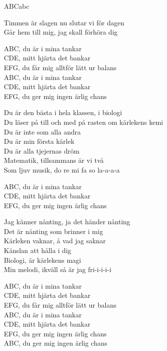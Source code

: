 \begin{song}{ABC}{abc}
\begin{vers}
Timmen är slagen nu slutar vi för dagen\\
Går hem till mig, jag skall förhöra dig\\
\end{vers}
\begin{vers}
ABC, du är i mina tankar\\
CDE, mitt hjärta det bankar\\
EFG, du får mig alltför lätt ur balans\\
ABC, du är i mina tankar\\
CDE, mitt hjärta det bankar\\
EFG, du ger mig ingen ärlig chans\\
\end{vers}
\begin{vers}
Du är den bästa i hela klassen, i biologi\\
Du läser på till och med på rasten om kärlekens kemi\\
Du är inte som alla andra\\
Du är min första kärlek\\
Du är alla tjejernas dröm\\
Matematik, tillsammans är vi två\\
Som ljuv musik, do re mi fa so la-a-a-a\\
\end{vers}
\begin{vers}
ABC, du är i mina tankar\\
CDE, mitt hjärta det bankar\\
EFG, du ger mig ingen ärlig chans\\
\end{vers}
\begin{vers}
Jag känner nånting, ja det händer nånting\\
Det är nånting som brinner i mig\\
Kärleken vaknar, å vad jag saknar\\
Känslan att hålla i dig\\
Biologi, är kärlekens magi\\
Min melodi, ikväll så är jag fri-i-i-i-i\\
\end{vers}
\begin{vers}
ABC, du är i mina tankar\\
CDE, mitt hjärta det bankar\\
EFG, du får mig alltför lätt ur balans\\
ABC, du är i mina tankar\\
CDE, mitt hjärta det bankar\\
EFG, du ger mig ingen ärlig chans\\
ABC, du ger mig ingen ärlig chans\\
\end{vers}
\end{song}
